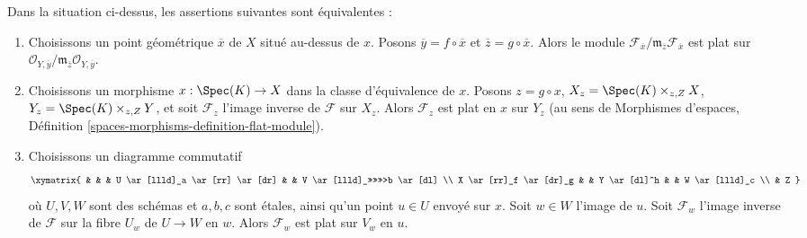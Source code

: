 \begin{lemma}
\label{lemma-flat-on-fibres-at-point}
Dans la situation ci-dessus, les assertions suivantes sont équivalentes :
\begin{enumerate}
\item Choisissons un point géométrique $\overline{x}$ de $X$ situé au-dessus de $x$.
Posons $\overline{y} = f \circ \overline{x}$ et
$\overline{z} = g \circ \overline{x}$. Alors le module
$\mathcal{F}_{\overline{x}}/
\mathfrak m_{\overline{z}}\mathcal{F}_{\overline{x}}$
est plat sur
$\mathcal{O}_{Y, \overline{y}}/
\mathfrak m_{\overline{z}}\mathcal{O}_{Y, \overline{y}}$.
\item Choisissons un morphisme $x : \Spec(K) \to X$ dans la classe d'équivalence de
$x$. Posons $z = g \circ x$, $X_z = \Spec(K) \times_{z, Z} X$,
$Y_z = \Spec(K) \times_{z, Z} Y$, et soit $\mathcal{F}_z$ l'image inverse
de $\mathcal{F}$ sur $X_z$. Alors $\mathcal{F}_z$ est plat en $x$ sur
$Y_z$ (au sens de Morphismes d'espaces,
Définition \ref{spaces-morphisms-definition-flat-module}).
\item Choisissons un diagramme commutatif
$$
\xymatrix{
& & & U \ar[llld]_a \ar[rr] \ar[dr] & & V \ar[llld]_>>>>>>>b \ar[dl] \\
X \ar[rr]_f \ar[dr]_g & & Y \ar[dl]^h &  & W \ar[llld]_c \\
& Z
}
$$
où $U, V, W$ sont des schémas et $a, b, c$ sont étales,
ainsi qu'un point $u \in U$ envoyé sur $x$. Soit $w \in W$ l'image de
$u$. Soit $\mathcal{F}_w$ l'image inverse de $\mathcal{F}$ sur
la fibre $U_w$ de $U \to W$ en $w$. Alors $\mathcal{F}_w$
est plat sur $V_w$ en $u$.
\end{enumerate}
\end{lemma}

